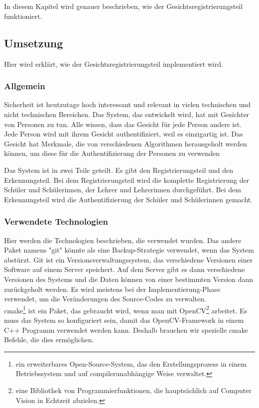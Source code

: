 
\chapter{\docname}
In diesem Kapitel wird genauer beschrieben, wie der Gesichtsregistrierungsteil funktioniert.
\label{\docname}
\section{Umsetzung}
Hier wird erkl\"art, wie der Gesichtsregistrierungsteil implementiert wird. 
\subsection{Allgemein}
Sicherheit ist heutzutage hoch interessant und relevant in vielen technischen und nicht technischen Bereichen. Das System, das entwickelt wird, hat mit Gesichter von Personen zu tun. Alle wissen, dass das Gesicht f\"ur jede Person anders ist. Jede Person wird mit ihrem Gesicht authentifiziert, weil es einzigartig ist. Das Gesicht hat Merkmale, die von verschiedenen Algorithmen herausgeholt werden k\"onnen, um diese f\"ur die Authentifizierung der Personen zu verwenden 

Das System ist in zwei Teile geteilt. Es gibt den Registrierungsteil und den Erkennungsteil. Bei dem Registrierungsteil wird die komplette Registrierung der Sch\"uler und Sch\"ulerinnen, der Lehrer und Lehrerinnen durchgef\"uhrt. Bei dem Erkennungsteil wird die Authentifizierung der Sch\"uler und Sch\"ulerinnen gemacht. 
\subsection{Verwendete Technologien}
Hier werden die Technologien beschrieben, die verwendet wurden.
Das andere Paket namens "git" k\"onnte als eine Backup-Strategie verwendet, wenn das System abst\"urzt. Git ist ein Versionsverwaltungssystem, das verschiedene Versionen einer Software auf einem Server speichert. Auf dem Server gibt es dann verschiedene Versionen des Systems und die Daten k\"onnen von einer bestimmten Version dann zur\"uckgeholt werden. Es wird meistens bei der Implementierung-Phase verwendet, um die Ver\"anderungen des Source-Codes zu verwalten. \\
cmake\footnote{ein erweiterbares Open-Source-System, das den Erstellungsprozess in einem Betriebssystem und auf compilerunabhängige Weise verwaltet.} ist ein Paket, das gebraucht wird, wenn man mit OpenCV\footnote{eine Bibliothek von Programmierfunktionen, die hauptsächlich auf Computer Vision in Echtzeit abzielen.} arbeitet. Es muss das System so konfiguriert sein, damit das OpenCV-Framework in einem C++ Programm verwendet werden kann. Deshalb brauchen wir spezielle cmake Befehle, die dies erm\"oglichen.


